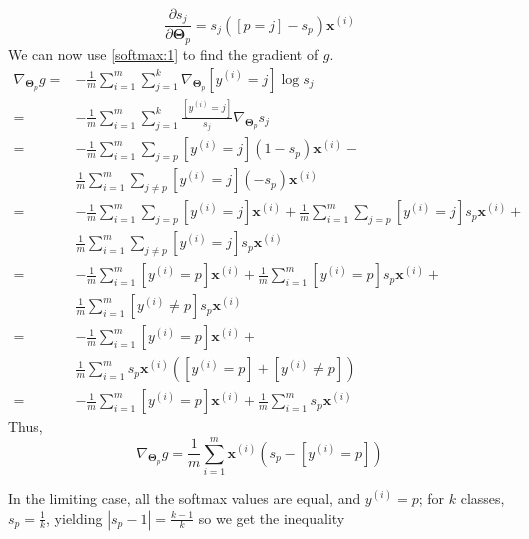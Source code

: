 \documentclass[sigconf,authordraft]{acmart}
\begin{document}
\begin{equation}
    \frac{\partial s_j}{\partial \boldsymbol\Theta_p} = s_j([p=j]-s_p)\textbf{x}^{(i)} \label{softmax:1}
\end{equation}
We can now use \eqref{softmax:1} to find the gradient of $g$.
\[
    \begin{aligned}
        \nabla_{\boldsymbol\Theta_p} g =& -\frac{1}{m} \sum\limits_{i=1}^m \sum\limits_{j=1}^k \nabla_{\boldsymbol\Theta_p} [y^{(i)}=j]\log s_j \\
        =& -\frac{1}{m} \sum\limits_{i=1}^m \sum\limits_{j=1}^k \frac{[y^{(i)}=j]}{s_j} \nabla_{\boldsymbol\Theta_p} s_j \\
        =& -\frac{1}{m} \sum\limits_{i=1}^m \sum\limits_{j=p} [y^{(i)}=j] (1-s_p)\textbf{x}^{(i)} - \\
        & \frac{1}{m} \sum\limits_{i=1}^m \sum\limits_{j \neq p} [y^{(i)}=j](-s_p)\textbf{x}^{(i)} \\
        =& -\frac{1}{m} \sum\limits_{i=1}^m \sum\limits_{j=p} [y^{(i)}=j]\textbf{x}^{(i)} + \frac{1}{m} \sum\limits_{i=1}^m \sum\limits_{j=p} [y^{(i)}=j]s_p \textbf{x}^{(i)} + \\
        & \frac{1}{m} \sum\limits_{i=1}^m \sum\limits_{j \neq p} [y^{(i)}=j]s_p \textbf{x}^{(i)} \\
        =& -\frac{1}{m} \sum\limits_{i=1}^m [y^{(i)}=p]\textbf{x}^{(i)} + \frac{1}{m} \sum\limits_{i=1}^m [y^{(i)}=p]s_p \textbf{x}^{(i)} + \\
        & \frac{1}{m} \sum\limits_{i=1}^m [y^{(i)} \neq p] s_p \textbf{x}^{(i)} \\
        =& -\frac{1}{m} \sum\limits_{i=1}^m [y^{(i)}=p]\textbf{x}^{(i)} + \\
        & \frac{1}{m} \sum\limits_{i=1}^m s_p \textbf{x}^{(i)} \left( [y^{(i)}=p] + [y^{(i)} \neq p] \right) \\
        =& -\frac{1}{m} \sum\limits_{i=1}^m [y^{(i)}=p]\textbf{x}^{(i)} + \frac{1}{m} \sum\limits_{i=1}^m s_p \textbf{x}^{(i)}
    \end{aligned}
\]
Thus,
\begin{equation}
    \nabla_{\boldsymbol\Theta_p} g = \frac{1}{m} \sum\limits_{i=1}^m \textbf{x}^{(i)} \left(s_p - [y^{(i)}=p] \right) \label{softmax:2}
\end{equation}

In the limiting case, all the softmax values are equal, and $y^{(i)} = p$; for $k$ classes, $s_p = \frac{1}{k}$, yielding $|s_p-1| = \frac{k-1}{k}$ so we get the inequality
\end{document}
